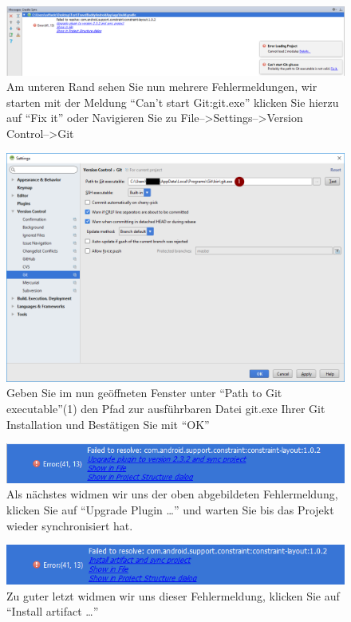 \documentclass[a4paper,10pt,xetex]{article}
\begin{document}
\begin{figure}
  \centering
  \includegraphics[width=\textwidth]{Installation/2-3}
  \caption{Am unteren Rand sehen Sie nun mehrere Fehlermeldungen, wir starten mit der Meldung ``Can't start Git:git.exe'' klicken Sie hierzu auf ``Fix it'' oder Navigieren Sie zu File-->Settings-->Version Control-->Git}
\end{figure}

\begin{figure}
  \centering
  \includegraphics[width=\textwidth]{Installation/2-4}
  \caption{Geben Sie im nun geöffneten Fenster unter ``Path to Git executable''(1) den Pfad zur ausführbaren Datei git.exe Ihrer Git Installation und Bestätigen Sie mit ``OK''}
\end{figure}

\begin{figure}
  \centering
  \includegraphics[width=\textwidth]{Installation/2-5}
  \caption{Als nächstes widmen wir uns der oben abgebildeten Fehlermeldung, klicken Sie auf ``Upgrade Plugin \ldots'' und warten Sie bis das Projekt wieder synchronisiert hat.}
\end{figure}

\begin{figure}
  \centering
  \includegraphics[width=\textwidth]{Installation/2-6}
  \caption{Zu guter letzt widmen wir uns dieser Fehlermeldung, klicken Sie auf ``Install artifact \ldots''}
\end{figure}
\end{document}
